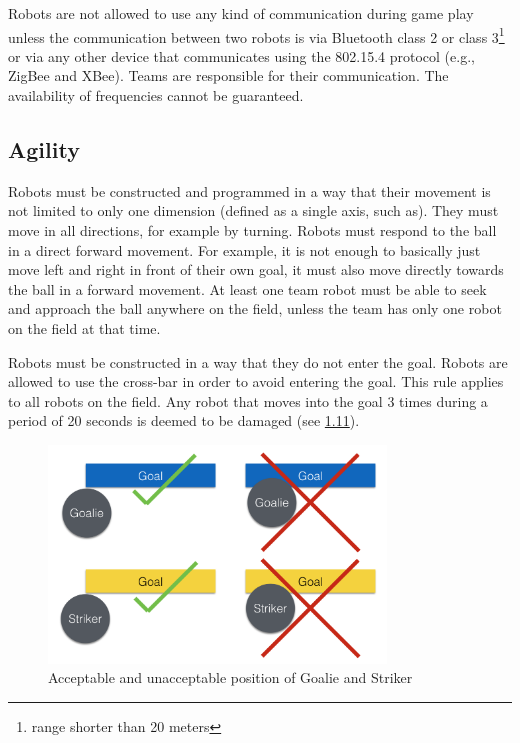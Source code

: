 \documentclass{article}
\begin{document}
Robots are not allowed to use any kind of communication during game play unless
the communication between two robots is via Bluetooth class 2 or class
3\footnote{range shorter than 20 meters} or via any other device that
communicates using the 802.15.4 protocol (e.g., ZigBee and XBee). Teams are
responsible for their communication. The availability of frequencies cannot be
guaranteed.

\subsection{Agility \label{ref-023}}

Robots must be constructed and programmed in a way that their movement is not
limited to only one dimension (defined as a single axis, such as). They must move in all
directions, for example by turning. Robots must respond to the ball in a direct
forward movement. For example, it is not enough to basically just move left and
right in front of their own goal, it must also move directly towards the ball in
a forward movement. At least one team robot must be able to seek and approach
the ball anywhere on the field, unless the team has only one robot on the field
at that time. 

Robots must be constructed in a way that they do
not enter the goal. Robots are allowed to use the cross-bar in order to avoid
entering the goal. This rule applies to all robots on the field. Any robot
that moves into the goal 3 times during a period of 20 seconds is deemed to be
damaged (see \hyperref[ref-012]{1.11}).

\begin{figure}[H]
    \centering
    \includegraphics[width=0.8\textwidth]{media/image3.png}
    \caption{Acceptable and unacceptable position of Goalie and Striker}
    \label{fig:robot_in_goal}
\end{figure}
\end{document}
